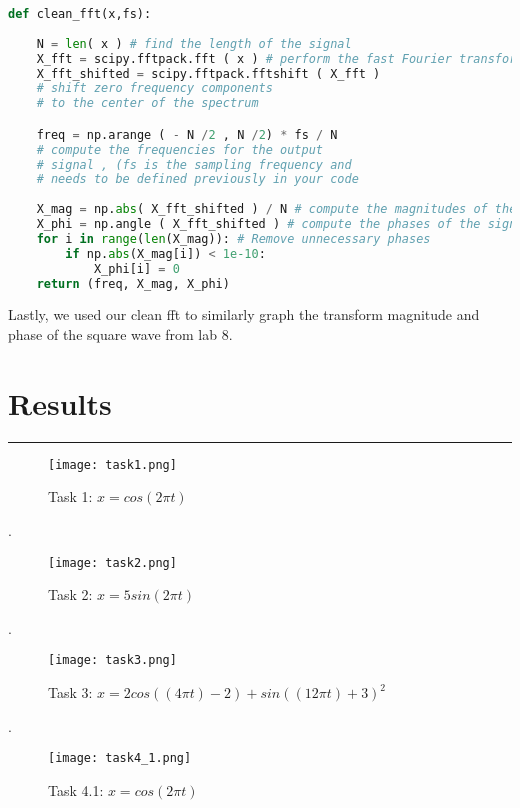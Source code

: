 \documentclass[12pt]{report}
\begin{document}
\begin{lstlisting}[language=Python, caption= $b_k$ values]
def clean_fft(x,fs):
    
    N = len( x ) # find the length of the signal
    X_fft = scipy.fftpack.fft ( x ) # perform the fast Fourier transform (fft)
    X_fft_shifted = scipy.fftpack.fftshift ( X_fft )    
    # shift zero frequency components
    # to the center of the spectrum

    freq = np.arange ( - N /2 , N /2) * fs / N        
    # compute the frequencies for the output
    # signal , (fs is the sampling frequency and
    # needs to be defined previously in your code
    
    X_mag = np.abs( X_fft_shifted ) / N # compute the magnitudes of the signal
    X_phi = np.angle ( X_fft_shifted ) # compute the phases of the signal
    for i in range(len(X_mag)): # Remove unnecessary phases 
        if np.abs(X_mag[i]) < 1e-10:
            X_phi[i] = 0
    return (freq, X_mag, X_phi)
\end{lstlisting}
Lastly, we used our clean fft to similarly graph the transform magnitude and phase of the square wave from lab 8. 
\newpage
\section*{Results}
\hrule
\vspace{1cm}
\setlength{\parindent}{5ex}

\vspace{2cm}
\begin{figure}[htp]
    \centering
    \texttt{[image: task1.png]}
    \caption{Task 1: $x = cos(2\pi t)$}
    \label{fig:ghj}
\end{figure}
\newpage
.
\vspace{3cm}
\begin{figure}[htp]
    \centering
    \texttt{[image: task2.png]}
    \caption{Task 2: $x = 5sin(2\pi t)$}
    \label{fig:ghj}
\end{figure}
\newpage
.
\vspace{3cm}
\begin{figure}[htp]
    \centering
    \texttt{[image: task3.png]}
    \caption{Task 3: $x = 2cos((4\pi t)-2)+sin((12\pi t)+3)^{2}$}
    \label{fig:ghj}
\end{figure}
\newpage

.
\vspace{3cm}
\begin{figure}[htp]
    \centering
    \texttt{[image: task4\_1.png]}
    \caption{Task 4.1: $x = cos(2\pi t)$ }
    \label{fig:ghj}
\end{figure}
\newpage
\end{document}
